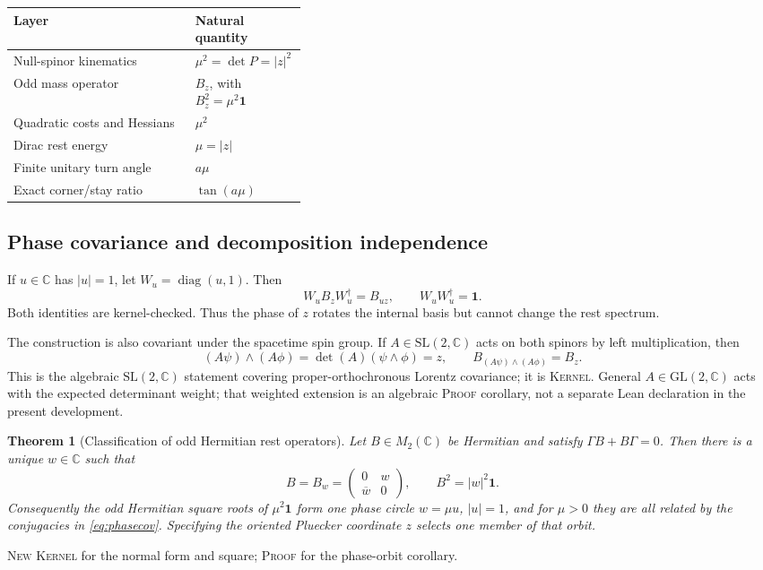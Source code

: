 \documentclass[11pt]{article}
\newcommand{\Kernel}{\textcolor{kernelcolor}{\textsc{Kernel}}}
\newcommand{\Human}{\textcolor{humanproofcolor}{\textsc{Proof}}}
\newcommand{\NewResult}{\textsc{New}}
\newcommand{\diag}{\operatorname{diag}}
\newcommand{\C}{\mathbb{C}}
\newcommand{\id}{\mathbf{1}}
\newtheorem{theorem}{Theorem}[section]
\begin{document}
\begin{center}
\begin{tabularx}{0.92\linewidth}{@{}X>{\raggedleft\arraybackslash}p{0.38\linewidth}@{}}
\toprule
Layer & Natural quantity\\
\midrule
Null-spinor kinematics & $\mu^2=\det P=|z|^2$\\
Odd mass operator & $B_z$, with $B_z^2=\mu^2\id$\\
Quadratic costs and Hessians & $\mu^2$\\
Dirac rest energy & $\mu=|z|$\\
Finite unitary turn angle & $a\mu$\\
Exact corner/stay ratio & $\tan(a\mu)$\\
\bottomrule
\end{tabularx}
\end{center}

\subsection{Phase covariance and decomposition independence}

If $u\in\C$ has $|u|=1$, let $W_u=\diag(u,1)$.  Then
\begin{equation}\label{eq:phasecov}
 W_uB_zW_u^\dagger=B_{uz},
 \qquad
 W_uW_u^\dagger=\id.
\end{equation}
Both identities are kernel-checked.  Thus the phase of $z$ rotates the internal
basis but cannot change the rest spectrum.

The construction is also covariant under the spacetime spin group.  If
$A\in\mathrm{SL}(2,\C)$ acts on both spinors by left multiplication, then
\begin{equation}\label{eq:sl2cov}
 (A\psi)\wedge(A\phi)=\det(A)(\psi\wedge\phi)=z,
 \qquad
 B_{(A\psi)\wedge(A\phi)}=B_z.
\end{equation}
This is the algebraic $\mathrm{SL}(2,\C)$ statement covering
proper-orthochronous Lorentz covariance; it is \Kernel{}.  General
$A\in\mathrm{GL}(2,\C)$ acts with the expected determinant weight; that
weighted extension is an algebraic \Human{} corollary, not a separate Lean
declaration in the present development.

\begin{theorem}[Classification of odd Hermitian rest operators]
\label{thm:classification}
Let $B\in M_2(\C)$ be Hermitian and satisfy
$\Gamma B+B\Gamma=0$.  Then there is a unique $w\in\C$ such that
\begin{equation}
 B=B_w=\begin{pmatrix}0&w\\\overline w&0\end{pmatrix},
 \qquad
 B^2=|w|^2\id.
\end{equation}
Consequently the odd Hermitian square roots of $\mu^2\id$ form one phase
circle $w=\mu u$, $|u|=1$, and for $\mu>0$ they are all related by the
conjugacies in \eqref{eq:phasecov}.  Specifying the oriented Pluecker
coordinate $z$ selects one member of that orbit.
\end{theorem}
\noindent\NewResult{} \Kernel{} for the normal form and square;
\Human{} for the phase-orbit corollary.
\end{document}
